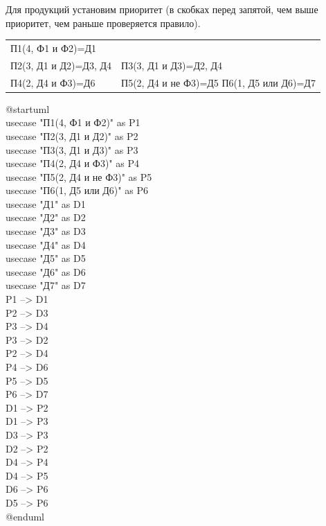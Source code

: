 \documentclass[14pt, a4paper, titlepage]{extarticle}
\begin{document}
Для продукций установим приоритет (в скобках перед запятой, чем выше приоритет, чем раньше проверяется правило).\\

\begin{tabular}{ll}
	П1(4, Ф1 и Ф2)=Д1 &\\
	П2(3, Д1 и Д2)=Д3, Д4 & П3(3, Д1 и Д3)=Д2, Д4 \\
	П4(2, Д4 и Ф3)=Д6 & П5(2, Д4 и не Ф3)=Д5
	П6(1, Д5 или Д6)=Д7
\end{tabular}

\noindent @startuml\\
usecase "П1(4, Ф1 и Ф2)" as P1\\
usecase "П2(3, Д1 и Д2)" as P2\\
usecase "П3(3, Д1 и Д3)" as P3\\
usecase "П4(2, Д4 и Ф3)" as P4\\
usecase "П5(2, Д4 и не Ф3)" as P5\\
usecase "П6(1, Д5 или Д6)" as P6\\
usecase "Д1" as D1\\
usecase "Д2" as D2\\
usecase "Д3" as D3\\
usecase "Д4" as D4\\
usecase "Д5" as D5\\
usecase "Д6" as D6\\
usecase "Д7" as D7\\
P1 --> D1\\
P2 --> D3\\
P3 --> D4\\
P3 --> D2\\
P2 --> D4\\
P4 --> D6\\
P5 --> D5\\
P6 --> D7\\
D1 --> P2\\
D1 --> P3\\
D3 --> P3\\
D2 --> P2\\
D4 --> P4\\
D4 --> P5\\
D6 --> P6\\
D5 --> P6\\
@enduml
\end{document}
